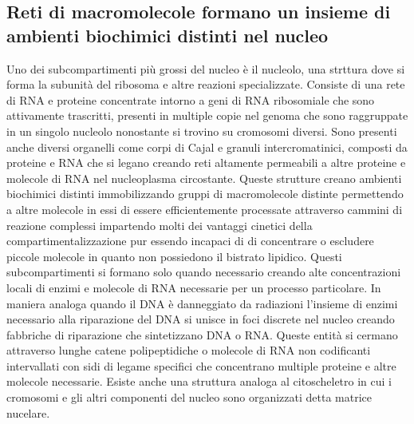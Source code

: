 \subsection{Reti di macromolecole formano un insieme di ambienti biochimici distinti nel nucleo}
Uno dei subcompartimenti pi\`u grossi del nucleo \`e il nucleolo, una strttura dove si forma la subunit\`a del ribosoma e altre reazioni specializzate. Consiste di una rete di RNA e 
proteine concentrate intorno a geni di RNA ribosomiale che sono attivamente trascritti, presenti in multiple copie nel genoma che sono raggruppate in un singolo nucleolo nonostante si 
trovino su cromosomi diversi. Sono presenti anche diversi organelli come corpi di Cajal e granuli intercromatinici, composti da proteine e RNA che si legano creando reti altamente
permeabili a altre proteine e molecole di RNA nel nucleoplasma circostante. Queste strutture creano ambienti biochimici distinti immobilizzando gruppi di macromolecole distinte 
permettendo a altre molecole in essi di essere efficientemente processate attraverso cammini di reazione complessi impartendo molti dei vantaggi cinetici della compartimentalizzazione 
pur essendo incapaci di di concentrare o escludere piccole molecole in quanto non possiedono il bistrato lipidico. Questi subcompartimenti si formano solo quando necessario creando 
alte concentrazioni locali di enzimi e molecole di RNA necessarie per un processo particolare. In maniera analoga quando il DNA \`e danneggiato da radiazioni l'insieme di enzimi 
necessario alla riparazione del DNA si unisce in foci discrete nel nucleo creando fabbriche di riparazione che sintetizzano DNA o RNA. Queste entit\`a si cermano attraverso 
lunghe catene polipeptidiche o molecole di RNA non codificanti intervallati con sidi di legame specifici che concentrano multiple proteine e altre molecole necessarie.  Esiste anche una
struttura analoga al citoscheletro in cui i cromosomi e gli altri componenti del nucleo sono organizzati detta matrice nucelare.
